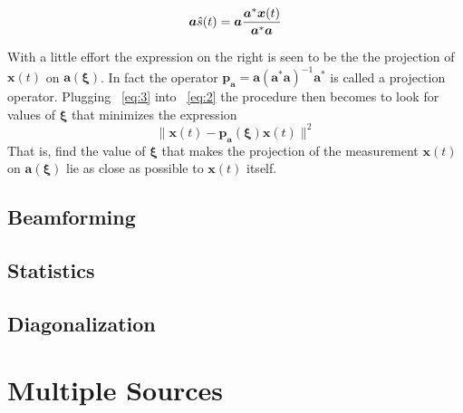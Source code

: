 \documentclass[11pt]{article}
\renewcommand{\vct}[1]{\boldsymbol{#1}}
\begin{document}
\begin{equation}\label{eq:3}
\\\vct{a}\hat{s}(t) = \vct{a}\frac{\vct{a}^*\vct{x}(t)}{\vct{a}^*\vct{a}}
\end{equation}

With a little effort the expression on the right is seen to be the the projection of $\vct{x}(t)$ on $\vct{a}(\vct{\xi})$.
In fact the operator $\vct{p}_{\vct{a}}=\vct{a}(\vct{a}^*\vct{a})^{-1}\vct{a}^*$ is called a projection operator.
Plugging ~\eqref{eq:3} into ~\eqref{eq:2} the procedure then becomes to look for values of $\vct{\xi}$ that minimizes the expression
\begin{equation}
    \|\vct{x}(t)-\vct{p}_{\vct{a}}(\vct{\xi})\vct{x}(t)\|^2
\end{equation}
That is, find the value of $\vct{\xi}$ that makes the projection of the measurement $\vct{x}(t)$ on $\vct{a}(\vct{\xi})$ lie as close as possible to $\vct{x}(t)$ itself.

\subsection{Beamforming}

\subsection{Statistics}

\subsection{Diagonalization}

\section{Multiple Sources}
\end{document}
